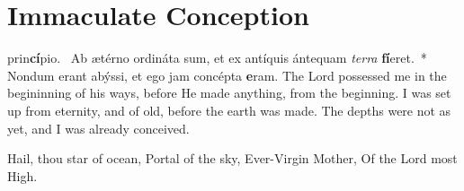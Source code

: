 {

\bigskip
\benedicamusdomino[1]
}








{
\label{immaculateconception}
\def\gabcfolder{../December8-ImmaculateConception}
\section{Immaculate Conception}
\subtitle{1st Class, December 8}

\deusinadjutorium{}

\bigskip
{}
{\def\anttranslation{Thou art all fair, O Mary; and the original stain is not in thee.}
\def\dontrepeatantiphon{T}
}
\bigskip
{}
{\def\anttranslation{Thy vesture is white as snow; and thy face is as the sun.}
}
\bigskip
{}
{\def\anttranslation{Thou art the glory of Jerusalem; thou art the joy of Israel; thou art the honour of our people.}
}
\bigskip
{
\def\anttranslation{Blessed art thou, O Virgin Mary, by the Lord, the Most High God, above all women upon the earth.}
\def\dontrepeatantiphon{T}
\def\noeuouae{T}
}
\bigskip
{
\def\anttranslation{Draw us, O immaculate Virgin: we will run after thee in the odour of thine ointments.}
}
{}
\printchapter
{ prin\-\textbf{cí}\-pi\-o.~\dag{} Ab ætérno ordináta sum, et ex antíquis ántequam \emph{ter\-ra} \textbf{fí}\-e\-ret.~* Nondum erant abýssi, et ego jam concépta \textbf{e}\-ram.}
{The Lord possessed me in the begininning of his ways, before He made anything, from the beginning.  I was set up from eternity, and of old, before the earth was made.  The depths were not as yet, and I was already conceived.}

\bigskip
\label{hymn-avemarisstella}
{
\item Hail, thou star of ocean,
Portal of the sky,
Ever-Virgin Mother,
Of the Lord most High.

}}
